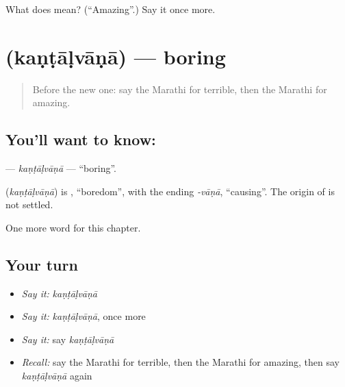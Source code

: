 \begin{tcolorbox}[breakable,colback=teal!4,colframe=teal!35!black,title={Before you move on}]
What does  mean? (\textquotedblleft{}Amazing\textquotedblright{}.) Say it once more.
\end{tcolorbox}
\section[\texorpdfstring{\mr{कंटाळवाणा} (kaṇṭāḷvāṇā)}{कंटाळवाणा (kaṇṭāḷvāṇā)}]{ (kaṇṭāḷvāṇā) — boring}

\label{lesson:MR-C235-kantalvana}



\begin{quote}
Before the new one: say the Marathi for terrible, then the Marathi for amazing.
\end{quote}

\subsection*{You'll want to know: }
\textbf{} — \emph{kaṇṭāḷvāṇā} — \textquotedblleft{}boring\textquotedblright{}.

\begin{cousinweb}
\textbf{} (\emph{kaṇṭāḷvāṇā}) is \textbf{}, \textquotedblleft{}boredom\textquotedblright{}, with the ending \emph{-vāṇā}, \textquotedblleft{}causing\textquotedblright{}. The origin of \textbf{} is not settled.
\end{cousinweb}

\begin{grammarlens}[title={What you've built}]
One more word for this chapter.
\end{grammarlens}

\subsection*{Your turn}
\begin{itemize}
\raggedright
  \item \emph{Say it:} \emph{kaṇṭāḷvāṇā}
  \item \emph{Say it:} \emph{kaṇṭāḷvāṇā}, once more
  \item \emph{Say it:} say \emph{kaṇṭāḷvāṇā}
  \item \emph{Recall:} say the Marathi for terrible, then the Marathi for amazing, then say \emph{kaṇṭāḷvāṇā} again
\end{itemize}

